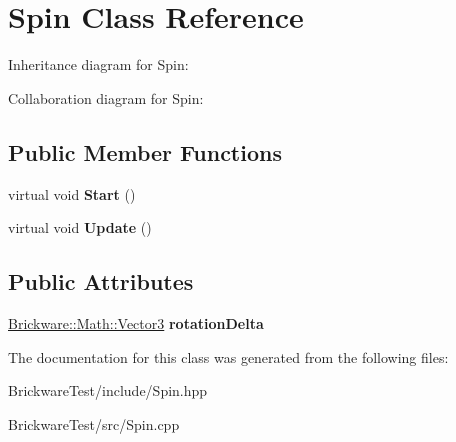 \hypertarget{classSpin}{}\section{Spin Class Reference}
\label{classSpin}


Inheritance diagram for Spin\+:


Collaboration diagram for Spin\+:
\subsection*{Public Member Functions}
\begin{DoxyCompactItemize}
\item 
\hypertarget{classSpin_a18f422ef1aa39909f23253811ad16650}{}virtual void {\bfseries Start} ()\label{classSpin_a18f422ef1aa39909f23253811ad16650}

\item 
\hypertarget{classSpin_a0ab10010b1e2d0e3fba28854f9519166}{}virtual void {\bfseries Update} ()\label{classSpin_a0ab10010b1e2d0e3fba28854f9519166}

\end{DoxyCompactItemize}
\subsection*{Public Attributes}
\begin{DoxyCompactItemize}
\item 
\hypertarget{classSpin_afeb661819f806c7f5dda7e16419cef00}{}\hyperlink{classBrickware_1_1Math_1_1Vector3}{Brickware\+::\+Math\+::\+Vector3} {\bfseries rotation\+Delta}\label{classSpin_afeb661819f806c7f5dda7e16419cef00}

\end{DoxyCompactItemize}


The documentation for this class was generated from the following files\+:\begin{DoxyCompactItemize}
\item 
Brickware\+Test/include/Spin.\+hpp\item 
Brickware\+Test/src/Spin.\+cpp\end{DoxyCompactItemize}
